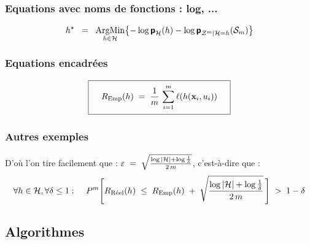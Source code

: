 \documentclass[a4paper, french]{article}
\newcommand{\prob}{\textbf{\textsf{\textup{p}}}}  %
\begin{document}
\subsubsection{Equations avec noms de fonctions : log, ...}

\begin{equation*}
h^{\star} \;\; = \;\; \operatornamewithlimits{ArgMin}_{h \in {\cal H}}
      \bigl\{ - \log \prob_{\cal H}(h) - \log {\prob}_{{{\cal Z}^m}|{\cal H}=h}({\cal S}_m) \bigr\}
\end{equation*}


\subsubsection{Equations encadrées}

\begin{equation}
\addtolength{\fboxsep}{2pt}
\boxed{~~~
R_{\text{Emp}}(h) \; = \; \frac{1}{m} \, \sum_{i=1}^{m} \ell(h({\mathbf x}_i, u_i)) 
~~~}
\end{equation}


\subsubsection{Autres exemples}

D'où l'on tire facilement que : $\varepsilon \; = \; \sqrt{\frac{\log{|{\cal H}|} + \log{\frac{1}{\delta}}}{2 \, m}}$, c'est-à-dire que :
\begin{equation*}
\label{eq-cvgce-normale}
\forall h \in {\cal H}, \forall \delta \leq 1 : \;\;\;\; P^m\Biggl[R_{\text{Réel}}(h) \; \leq \; R_{\text{Emp}}(h) \; + \; \sqrt{\frac{\log{|{\cal H}|} + \log{\frac{1}{\delta}}}{2 \, m}} \, \Biggr] \; > \; 1 - \delta
\end{equation*}


\subsection{Algorithmes}
\end{document}
